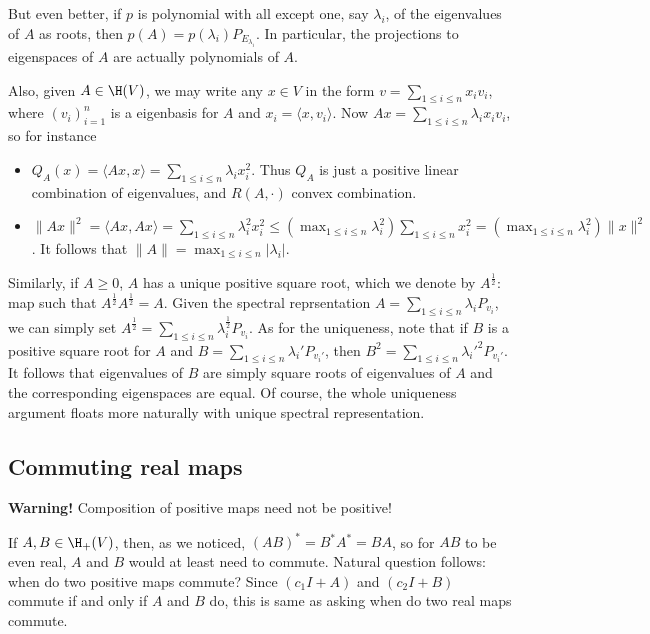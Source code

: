 But even better, if $p$ is polynomial with all except one, say $\lambda_{i}$, of the eigenvalues of $A$ as roots, then $p(A) = p(\lambda_{i}) P_{E_{\lambda_{i}}}$. In particular, the projections to eigenspaces of $A$ are actually polynomials of $A$.

Also, given $A \in \H(V)$, we may write any $x \in V$ in the form $v = \sum_{1 \leq i \leq n} x_{i} v_{i}$, where $(v_{i})_{i = 1}^{n}$ is a eigenbasis for $A$ and $x_{i} = \langle x, v_{i} \rangle$. Now $A x = \sum_{1 \leq i \leq n} \lambda_{i} x_{i} v_{i}$, so for instance

\begin{itemize}
\item $Q_{A}(x) = \langle A x, x \rangle = \sum_{1 \leq i \leq n} \lambda_{i} x_{i}^{2}$. Thus $Q_{A}$ is just a positive linear combination of eigenvalues, and $R(A, \cdot)$ convex combination.
\item $\|A x\|^{2} = \langle A x, A x \rangle = \sum_{1 \leq i \leq n} \lambda_{i}^{2} x_{i}^{2} \leq \left(\max_{1 \leq i \leq n} \lambda_{i}^2 \right) \sum_{1 \leq i \leq n} x_{i}^2 = \left(\max_{1 \leq i \leq n} \lambda_{i}^2 \right) \|x\|^{2}$. It follows that $\|A\| = \max_{1 \leq i \leq n} |\lambda_{i}|$.
\end{itemize}

Similarly, if $A \geq 0$, $A$ has a unique positive square root, which we denote by $A^{\frac{1}{2}}$: map such that $A^{\frac{1}{2}} A^{\frac{1}{2}} = A$. Given the spectral reprsentation $A = \sum_{1 \leq i \leq n} \lambda_{i} P_{v_{i}}$, we can simply set $A^{\frac{1}{2}} = \sum_{1 \leq i \leq n} \lambda_{i}^{\frac{1}{2}} P_{v_{i}}$. As for the uniqueness, note that if $B$ is a positive square root for $A$ and $B = \sum_{1 \leq i \leq n} \lambda_{i}' P_{v_{i}'}$, then $B^2 = \sum_{1 \leq i \leq n} \lambda_{i}'^{2} P_{v_{i}'}$. It follows that eigenvalues of $B$ are simply square roots of eigenvalues of $A$ and the corresponding eigenspaces are equal. Of course, the whole uniqueness argument floats more naturally with unique spectral representation.

\subsection{Commuting real maps}

\textbf{Warning!} Composition of positive maps need not be positive!

If $A, B \in \H_{+}(V)$, then, as we noticed, $(A B)^{*} = B^{*} A^{*} = B A$, so for $A B$ to be even real, $A$ and $B$ would at least need to commute. Natural question follows: when do two positive maps commute? Since $(c_{1} I + A)$ and $(c_{2} I + B)$ commute if and only if $A$ and $B$ do, this is same as asking when do two real maps commute.

